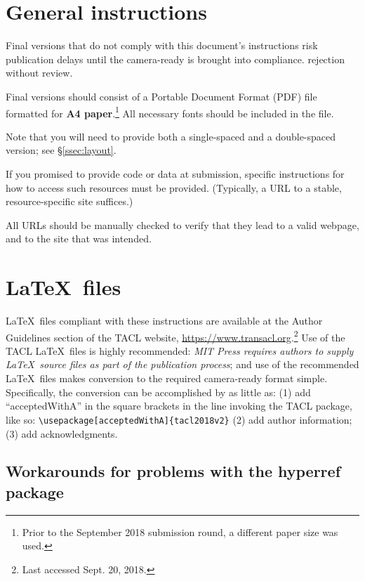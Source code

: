 \documentclass[11pt,a4paper]{article}
\newcommand{\dateOfLastUpdate}{Sept. 20, 2018}
\newcommand{\styleFileVersion}{tacl2018v2}
\newcommand{\Taclpaper}{Final version\xspace}
\newcommand{\Taclpapers}{Final versions\xspace}
\newcommand{\Taclpaper}{Submission\xspace}
\newcommand{\Taclpapers}{{\Taclpaper}s\xspace}
\begin{document}
\section{General instructions}

\Taclpapers that do not comply with this document's instructions
risk
\iftaclpubformat
publication delays until the camera-ready is brought into compliance.
\else
rejection without review.
\fi


\Taclpapers should consist of a Portable Document Format (PDF) file formatted
for  \textbf{A4 paper}.\footnote{Prior to the September 2018 submission round, a
different paper size was used.} All necessary fonts should be
included in the  file.

\iftaclpubformat
Note that you will need to provide both a single-spaced and a double-spaced
version; see \S \ref{ssec:layout}.

If you promised to provide code or data at submission, specific instructions for
how to access such resources must be provided.  (Typically, a URL to a stable,
resource-specific site suffices.)

All URLs should be manually checked to verify that they
lead to a valid webpage, and to the site that was intended.
\fi


\section{\LaTeX\ files}

\LaTeX\ files compliant with these instructions are available at the
Author Guidelines section of the
TACL website, \href{https://www.transacl.org/}
{https://www.transacl.org}.\footnote{Last accessed \dateOfLastUpdate.} Use of the
TACL \LaTeX\ files is highly recommended: \emph{MIT Press requires authors to
supply \LaTeX\ source files as part of the publication process}; and
use of the recommended \LaTeX\ files makes conversion to the
required camera-ready format simple.
\iftaclpubformat
Specifically, the conversion can be accomplished by as little as: (1) add
``acceptedWithA'' in the square brackets in the line invoking the TACL package,
like so:
{\footnotesize {\tt {\textbackslash usepackage}[acceptedWithA]\{\styleFileVersion\}}} (2) add author information;
(3) add acknowledgments.
\fi

\subsection{Workarounds for problems with the hyperref package}
\end{document}
